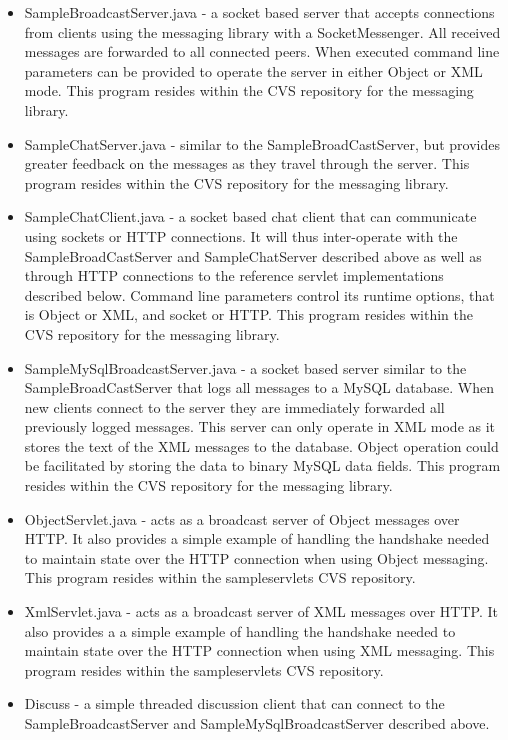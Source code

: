 \documentclass{article}
\begin{document}
\begin{itemize}

\item SampleBroadcastServer.java - a socket based server that accepts
connections from clients using the messaging library with a
SocketMessenger.  All received messages are forwarded to all connected
peers.  When executed command line parameters can be provided to
operate the server in either Object or XML mode.  This program resides
within the CVS repository for the messaging library.

\item SampleChatServer.java - similar to the SampleBroadCastServer, but
provides greater feedback on the messages as they travel through the
server.  This program resides within the CVS repository for the messaging
library.

\item SampleChatClient.java - a socket based chat client that can
communicate using sockets or HTTP connections.  It will thus
inter-operate with the SampleBroadCastServer and SampleChatServer
described above as well as through HTTP connections to the reference
servlet implementations described below.  Command line parameters
control its runtime options, that is Object or XML, and socket or
HTTP.  This program resides within the CVS repository for the messaging
library.

\item SampleMySqlBroadcastServer.java - a socket based server similar to the
SampleBroadCastServer that logs all messages to a MySQL database.
When new clients connect to the server they are immediately forwarded
all previously logged messages.  This server can only operate in XML
mode as it stores the text of the XML messages to the database.
Object operation could be facilitated by storing the data to binary
MySQL data fields.  This program resides within the CVS repository for the
messaging library.

\item ObjectServlet.java - acts as a broadcast server of Object messages
over HTTP.  It also provides a simple example of handling the
handshake needed to maintain state over the HTTP connection when using
Object messaging.  This program resides within the sampleservlets CVS
repository.

\item XmlServlet.java - acts as a broadcast server of XML messages over
HTTP.  It also provides a a simple example of handling the handshake
needed to maintain state over the HTTP connection when using XML
messaging.  This program resides within the sampleservlets CVS
repository.

\item Discuss - a simple threaded discussion client that can connect to the
SampleBroadcastServer and SampleMySqlBroadcastServer described above.

\end{itemize}
\end{document}
